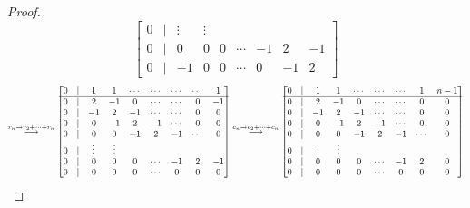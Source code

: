 \documentclass[11pt,reqno]{amsart}
\newcommand\scalemath[2]{\scalebox{#1}{\mbox{\ensuremath{\displaystyle #2}}}}
\theoremstyle{definition}
\theoremstyle{plain}
\begin{document}
\begin{proof}
\[{\begin{bmatrix}
	0 & | & \vdots & \vdots \\
	0 & | & 0 & 0 & 0 & \cdots & -1& 2 & -1 \\
	0 & | & -1 & 0 & 0 & \cdots& 0 & -1 & 2 
\end{bmatrix} }
\]
\vspace{0.2cm}
\[
\scalemath{0.85}{ \stackrel{r_n \to r_2 + \cdots + r_{n}}\longrightarrow
\begin{bmatrix}
	0 & | & 1 & 1 & \cdots & \cdots & \cdots & \cdots & 1 \\
	\hline
	0 & | & 2 & -1 & 0 & \cdots & \cdots & 0 & -1 \\
	0 & | & - 1& 2 & -1 & \cdots & \cdots & 0 & 0 \\
	0 & | & 0 & - 1& 2 & -1 & \cdots & 0 & 0 \\
	0 & | & 0 & 0 & - 1& 2 & -1 & \cdots & 0 \\
	0 & | & \vdots & \vdots \\
	0 & | & 0 & 0 & 0 & \cdots & -1& 2 & -1 \\
	0 & | & 0 & 0 & 0 & \cdots& 0 & 0 & 0
\end{bmatrix}
\stackrel{c_n \to c_2 + \cdots + c_{n}}\longrightarrow
\begin{bmatrix}
	0 & | & 1 & 1 & \cdots & \cdots & \cdots & 1 & n-1 \\
	\hline
	0 & | & 2 & -1 & 0 & \cdots & \cdots & 0 & 0 \\
	0 & | & - 1& 2 & -1 & \cdots & \cdots & 0 & 0 \\
	0 & | & 0 & - 1& 2 & -1 & \cdots & 0 & 0 \\
	0 & | & 0 & 0 & - 1& 2 & -1 & \cdots & 0 \\
	0 & | & \vdots & \vdots \\
	0 & | & 0 & 0 & 0 & \cdots & -1& 2 & 0 \\
	0 & | & 0 & 0 & 0 & \cdots& 0 & 0 & 0
\end{bmatrix} }
\]

\end{proof}
\end{document}
